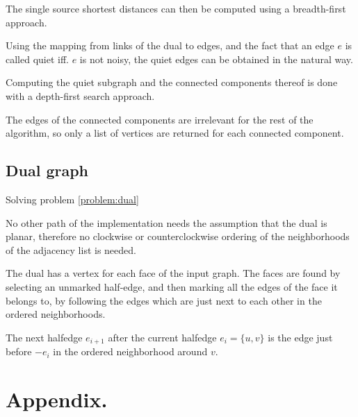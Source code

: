 \documentclass{article}
\begin{document}
		The single source shortest distances can then be computed using a breadth-first approach.

		Using the mapping from links of the dual to edges, and the fact that an edge $e$ is called quiet iff. $e$ is not noisy, the quiet edges can be obtained in the natural way.

		Computing the quiet subgraph and the connected components thereof is done with a depth-first search approach.

		The edges of the connected components are irrelevant for the rest of the algorithm, so only a list of vertices are returned for each connected component.


	\subsection{Dual graph}\label{impl:dual}

		Solving problem \ref{problem:dual}

		No other path of the implementation needs the assumption that the dual is planar, therefore no clockwise or counterclockwise ordering of the neighborhoods of the adjacency list is needed.

		The dual has a vertex for each face of the input graph. The faces are found by selecting an unmarked half-edge, and then marking all the edges of the face it belongs to, by following the edges which are just next to each other in the ordered neighborhoods.

		The next halfedge $e_{i+1}$ after the current halfedge $e_i = \{u, v\}$ is the edge just before $-e_i$ in the ordered neighborhood around $v$.



\section{Appendix.}
	
\end{document}

